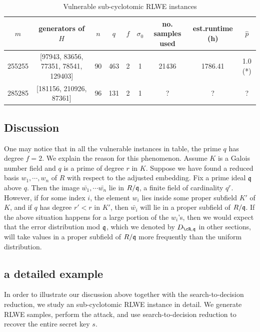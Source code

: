 \documentclass{amsart}
\begin{document}

\begin{table}[H]
\caption{Vulnerable sub-cyclotomic RLWE instances}
\begin{tabular}{c|c|c|c|c|c|c|c|c}
$m$ & generators of $H$ & $n$ & $q$ & $f$ & $\sigma_0$ & no. samples used & est.runtime (h) & $\hat{p}$ \\ \hline
255255 & [97943, 83656, 77351, 78541, 129403] & 90 & 463 & 2 & 1 & 21436 & 1786.41 & 1.0 (*) \\
285285 & [181156, 210926, 87361] & 96 & 131 & 2 & 1 & ? & ? & ?
\end{tabular}
\end{table}

\subsection{Discussion}
One may notice that in all the vulnerable instances in table, the prime $q$ has degree $f = 2$. We explain the reason for this phenomenon. Assume $K$ is a Galois number field and $q$ is a prime of degree $r$ in $K$. Suppose we have found a reduced basis $w_1,\cdots, w_n$ of $R$ with respect to the adjusted embedding. Fix a prime ideal $\mathfrak{q}$ above $q$. Then the image $\bar{w_1}, \cdots \bar{w_n}$ lie in $R/\mathfrak{q}$, a finite field of cardinality $q^r$. However, if for some index $i$, the element $w_i$ lies inside some proper subfield $K'$ of $K$, and if $q$ has degree $r' < r$ in $K'$, then  $\bar{w_i}$ will lie in a proper subfield of $R/\mathfrak{q}$. If the above situation happens for a large portion of the $w_i$'s, then we would expect that the error distribution mod $\mathfrak{q}$, which we denoted by $D_{\cR,\fq}$ in other sections, will take values in a proper subfield of $R/\mathfrak{q}$ more frequently than the uniform distribution.

\subsection{a detailed example}
In order to illustrate our discussion above together with the search-to-decision reduction, we study an sub-cyclotomic RLWE instance in detail. We generate RLWE samples, perform the attack, and use search-to-decision reduction to recover the entire secret key $s$.
\end{document}
